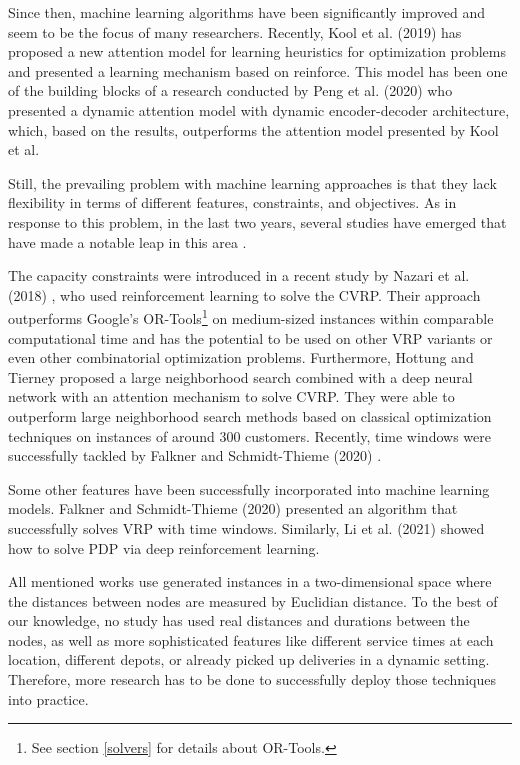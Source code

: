 Since then, machine learning algorithms have been significantly improved and seem to be the focus of many researchers. Recently, Kool et al. (2019) \cite{Kool2019} has proposed a new attention model for learning heuristics for optimization problems and presented a learning mechanism based on reinforce. This model has been one of the building blocks of a research conducted by Peng et al. (2020) \cite{Peng2020} who presented a dynamic attention model with dynamic encoder-decoder architecture, which, based on the results, outperforms the attention model presented by Kool et al.

Still, the prevailing problem with machine learning approaches is that they lack flexibility in terms of different features, constraints, and objectives. As in response to this problem, in the last two years, several studies have emerged that have made a notable leap in this area \cite{Nazari2018, Hottung2019, Falkner2020, Li2021}.

The capacity constraints were introduced in a recent study by Nazari et al. (2018) \cite{Nazari2018}, who used reinforcement learning to solve the CVRP. Their approach outperforms Google's OR-Tools\footnote{See section \ref{solvers} for details about OR-Tools.} on medium-sized instances within comparable computational time and has the potential to be used on other VRP variants or even other combinatorial optimization problems. Furthermore, Hottung and Tierney \cite{Hottung2019} proposed a large neighborhood search combined with a deep neural network with an attention mechanism to solve CVRP. They were able to outperform large neighborhood search methods based on classical optimization techniques on instances of around 300 customers. Recently, time windows were successfully tackled by Falkner and Schmidt-Thieme (2020) \cite{Falkner2020}.

Some other features have been successfully incorporated into machine learning models. Falkner and Schmidt-Thieme (2020) \cite{Falkner2020} presented an algorithm that successfully solves VRP with time windows. Similarly, Li et al. (2021) \cite{Li2021} showed how to solve PDP via deep reinforcement learning.

All mentioned works use generated instances in a two-dimensional space where the distances between nodes are measured by Euclidian distance. To the best of our knowledge, no study has used real distances and durations between the nodes, as well as more sophisticated features like different service times at each location, different depots, or already picked up deliveries in a dynamic setting. Therefore, more research has to be done to successfully deploy those techniques into practice.

